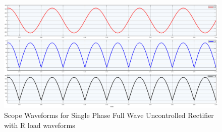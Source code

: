 \begin{figure}[h]
    \centering
    \includegraphics[width=1\textwidth]{images/experiment-2/circuit-scope-simulation-01.png}
    \caption{Scope Waveforms for Single Phase Full Wave Uncontrolled Rectifier with R load waveforms}
    \label{Fig_waveform_single-phase-full-wave-uncontrolled-rectifier-with-R-load}
\end{figure}

\pagebreak
